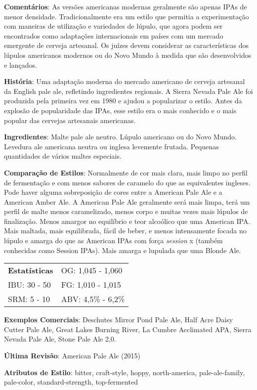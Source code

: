 \textbf{Comentários}: As versões americanas modernas geralmente são apenas IPAs de menor densidade. Tradicionalmente era um estilo que permitia a experimentação com maneiras de utilização e variedades de lúpulo, que agora podem ser encontrados como adaptações internacionais em países com um mercado emergente de cerveja artesanal. Os juízes devem considerar as características dos lúpulos americanos modernos ou do Novo Mundo à medida que são desenvolvidos e lançados.

\textbf{História}: Uma adaptação moderna do mercado americano de cerveja artesanal da English pale ale, refletindo ingredientes regionais. A Sierra Nevada Pale Ale foi produzida pela primeira vez em 1980 e ajudou a popularizar o estilo. Antes da explosão de popularidade das IPAs, esse estilo era o mais conhecido e o mais popular das cervejas artesanais americanas.

\textbf{Ingredientes}: Malte pale ale neutro. Lúpulo americano ou do Novo Mundo. Levedura ale americana neutra ou inglesa levemente frutada. Pequenas quantidades de vários maltes especiais.

\textbf{Comparação de Estilos}: Normalmente de cor mais clara, mais limpo no perfil de fermentação e com menos sabores de caramelo do que as equivalentes ingleses. Pode haver alguma sobreposição de cores entre a American Pale Ale e a American Amber Ale. A American Pale Ale geralmente será mais limpa, terá um perfil de malte menos caramelizado, menos corpo e muitas vezes mais lúpulos de finalização. Menos amargor no equilíbrio e teor alcoólico que uma American IPA. Mais maltada, mais equilibrada, fácil de beber, e menos intensamente focada no lúpulo e amarga do que as American IPAs com força \textit{session} x  (também conhecidas como Session IPAs). Mais amarga e lupulada que uma Blonde Ale.

\begin{tabular}{@{}p{35mm}p{35mm}@{}}
  \textbf{Estatísticas} & OG: 1,045 - 1,060 \\
  IBU: 30 - 50  & FG: 1,010 - 1,015  \\
  SRM: 5 - 10  & ABV: 4,5\% - 6,2\%
\end{tabular}

\textbf{Exemplos Comerciais}: Deschutes Mirror Pond Pale Ale, Half Acre Daisy Cutter Pale Ale, Great Lakes Burning River, La Cumbre Acclimated APA, Sierra Nevada Pale Ale, Stone Pale Ale 2,0.

\textbf{Última Revisão}: American Pale Ale (2015)

\textbf{Atributos de Estilo}: bitter, craft-style, hoppy, north-america, pale-ale-family, pale-color, standard-strength, top-fermented
